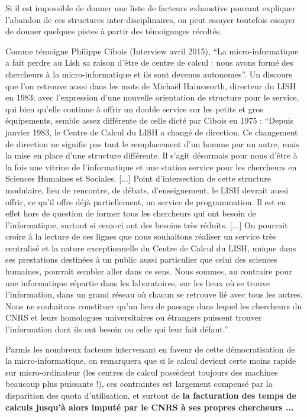Si il est impossible de donner une liste de facteurs exhaustive pouvant expliquer l'abandon de ces structures inter-disciplinaires, on peut essayer toutefois essayer de donner quelques pistes à partir des témoignages récoltés.

Comme témoigne Philippe Cibois (Interview avril 2015), \enquote{La micro-informatique a fait perdre au Lish sa raison d'être de centre de calcul : nous avons formé des chercheurs à la micro-informatique et ils sont devenus autonomes}. Un discours que l’on retrouve aussi dans les mots de Michaël Hainsworth, directeur du LISH en 1983; avec l’expression d’une nouvelle orientation de structure pour le service, qui bien qu’elle continue à offrir un double service sur les petits et gros équipements, semble assez différente de celle dicté par Cibois en 1975 : \enquote{Depuis janvier 1983, le Centre de Calcul du LISH a changé de direction. Ce changement de direction ne signifie pas tant le remplacement d'un homme par un autre, mais la mise en place d'une structure différente. Il s'agit désormais pour nous d'être à la fois une vitrine de l'informatique et une station service pour les chercheurs en Sciences Humaines et Sociales. [...] Point d'intersection de cette structure modulaire, lieu de rencontre, de débats, d'enseignement, le LISH devrait aussi offrir, ce qu'il offre déjà partiellement, un service de programmation. Il est en effet hors de question de former tous les chercheurs qui ont besoin de l'informatique, surtout si ceux-ci ont des besoins très réduits. [...] On pourrait croire à la lecture de ces lignes que nous souhaitons réaliser un service très centralisé et la nature exceptionnelle du Centre de Calcul du LISH, unique dans ses prestations destinées à un public aussi particulier que celui des sciences humaines, pourrait sembler aller dans ce sens. Nous sommes, au contraire pour une informatique répartie dans les laboratoires, sur les lieux où se trouve l'information, dans un grand réseau où chacun se retrouve lié avec tous les autres. Nous ne souhaitons constituer qu'un lieu de passage dans lequel les chercheurs du CNRS et leurs homologues universitaires ou étrangers puissent trouver l'information dont ils ont besoin ou celle qui leur fait défaut.}

Parmis les nombreux facteurs intervenant en faveur de cette démocratisation de la micro-informatique, on remarquera que si le calcul devient certe moins rapide sur micro-ordinateur (les centres de calcul possèdent toujours des machines beaucoup plus puissante !), ces contraintes est largement compensé par la disparition des quota d'utilisation, et surtout de \textbf{la facturation des temps de calculs jusqu’à alors imputé par le CNRS à ses propres chercheurs ...}

